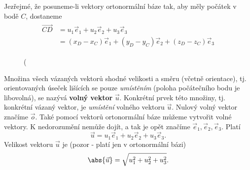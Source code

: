       Jezřejmé, že posuneme-li vektory ortonormální báze tak, aby měly počátek v bodě \(C\), dostaneme
      \begin{gather*}
        \begin{align*}
          \overrightarrow{CD} &= u_1\vec{e}_1 + u_2\vec{e}_2 + u_3\vec{e}_3       \\
                              &= (x_D - x_C)\vec{e}_1 + (y_D - y_C)\vec{e}_2 + (z_D - z_C)\vec{e}_3
        \end{align*}
      \end{gather*}
      \begin{figure}[ht!]  %
        \centering
        \caption{ (\cite[s.~6]{Kulhanek2018}}
        \label{mai:fig060}
      \end{figure}

      Množina všech vázaných vektorů shodné velikosti a směru (včetně orientace), tj. orientovaných
      úseček lišících se pouze \emph{umístěním} (poloha počátečního bodu je libovolná), se nazývá
      \textbf{volný vektor} \(\vec{u}\). Konkrétní prvek této množiny, tj. konkrétní vázaný vektor, je
      \emph{umístění} volného vektoru \(\vec{u}\). Nulový volný vektor značíme \(\vec{o}\). Také
      pomocí vektorů ortonormální báze můžeme vytvořit volné vektory. K nedorozumění nemůže dojít, a
      tak je opět značíme \(\vec{e}_1, \vec{e}_2, \vec{e}_3\). Platí
      \begin{equation*}
        \vec{u} = u_1\vec{e}_1 + u_2\vec{e}_2 + u_3\vec{e}_3.
      \end{equation*}
      Velikost vektoru \(\vec{u}\) je (pozor - platí jen v ortonormální bázi)
      \begin{equation*}
        \abs{\vec{u}} = \sqrt{u_1^2 + u_2^2 + u_3^2}.
      \end{equation*}

